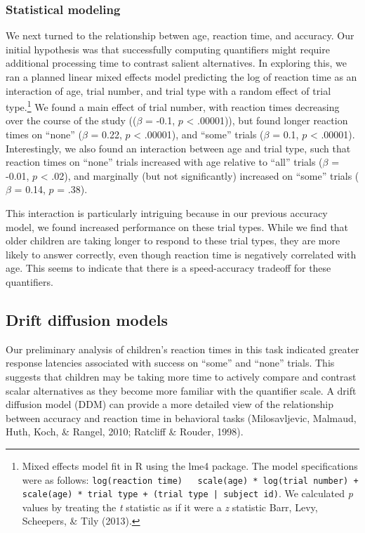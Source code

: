\documentclass[10pt, letterpaper]{article}
\begin{document}
\subsubsection{Statistical modeling}\label{statistical-modeling-1}

We next turned to the relationship betwen age, reaction time, and
accuracy. Our initial hypothesis was that successfully computing
quantifiers might require additional processing time to contrast salient
alternatives. In exploring this, we ran a planned linear mixed effects
model predicting the log of reaction time as an interaction of age,
trial number, and trial type with a random effect of trial
type.\footnote{Mixed effects model fit in R using the lme4 package. The
  model specifications were as follows:
  \texttt{log(reaction time) ~ scale(age) * log(trial number) + scale(age) * trial type + (trial type | subject id)}.
  We calculated \emph{p} values by treating the \emph{t} statistic as if
  it were a \emph{z} statistic Barr, Levy, Scheepers, \& Tily (2013).}
We found a main effect of trial number, with reaction times decreasing
over the course of the study ((\(\beta\) = -0.1, \(p\) \textless{}
.00001)), but found longer reaction times on ``none'' (\(\beta\) = 0.22,
\(p\) \textless{} .00001), and ``some'' trials (\(\beta\) = 0.1, \(p\)
\textless{} .00001). Interestingly, we also found an interaction between
age and trial type, such that reaction times on ``none'' trials
increased with age relative to ``all'' trials (\(\beta\) = -0.01, \(p\)
\textless{} .02), and marginally (but not significantly) increased on
``some'' trials (\(\beta\) = 0.14, \(p\) = .38).

This interaction is particularly intriguing because in our previous
accuracy model, we found increased performance on these trial types.
While we find that older children are taking longer to respond to these
trial types, they are more likely to answer correctly, even though
reaction time is negatively correlated with age. This seems to indicate
that there is a speed-accuracy tradeoff for these quantifiers.

\subsection{Drift diffusion models}\label{drift-diffusion-models}

Our preliminary analysis of children's reaction times in this task
indicated greater response latencies associated with success on ``some''
and ``none'' trials. This suggests that children may be taking more time
to actively compare and contrast scalar alternatives as they become more
familiar with the quantifier scale. A drift diffusion model (DDM) can
provide a more detailed view of the relationship between accuracy and
reaction time in behavioral tasks (Milosavljevic, Malmaud, Huth, Koch,
\& Rangel, 2010; Ratcliff \& Rouder, 1998).
\end{document}
